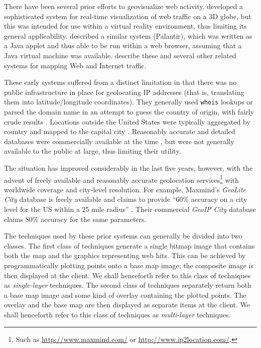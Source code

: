 \documentclass[acmnow]{acmtrans2m}
\begin{document}
There have been several prior efforts to geovisualize web activity.
 developed a sophisticated system for
real-time visualization of web traffic on a 3D globe, but this was
intended for use within a virtual reality environment, thus limiting its
general applicability.  described a similar
system (Palantir), which was written as a Java applet and thus able to
be run within a web browser, assuming that a Java virtual machine was
available.  describe these
and several other related systems for mapping Web and Internet traffic.

These early systems suffered from a distinct limitation in that there
was no public infrastructure in place for geolocating IP addresses (that
is, translating them into latitude/longitude coordinates). They
generally used \texttt{whois} lookups or parsed the domain name in an
attempt to guess the country of origin, with fairly crude results
\cite{Lamm-SE-1996-webvis}. Locations outside the United States were
typically aggregated by country and mapped to the capital city
\cite{Lamm-SE-1996-webvis,Papa-N-1998-Palantir,Jian-B-2000-cybermap}.
Reasonably accurate and detailed databases were commercially available
at the time \cite[p.\ 1466]{Lamm-SE-1996-webvis}, but were not generally
available to the public at large, thus limiting their utility.

The situation has improved considerably in the last five years, however,
with the advent of freely available and reasonably accurate geolocation
services\footnote{Such as \url{http://www.maxmind.com/} or
\url{http://www.ip2location.com/}.} with worldwide coverage and
city-level resolution. For example, Maxmind's \emph{GeoLite City}
database is freely available and claims to provide ``60\% accuracy on a
city level for the US within a 25 mile radius''
\cite{Maxm-G-2006-GeoLiteCity}. Their commercial \emph{GeoIP City}
database claims 80\% accuracy for the same parameters.

The techniques used by these prior systems can generally be divided into
two classes. The first class of techniques generate a single bitmap
image that contains both the map and the graphics representing web hits.
This can be achieved by programmatically plotting points onto a base map
image; the composite image is then displayed at the client. We shall
henceforth refer to this class of techniques as \emph{single-layer}
techniques. The second class of techniques separately return both a base
map image and some kind of overlay containing the plotted points. The
overlay and the base map are then displayed as separate items at the
client. We shall henceforth refer to this class of techniques as
\emph{multi-layer} techniques.
\end{document}
